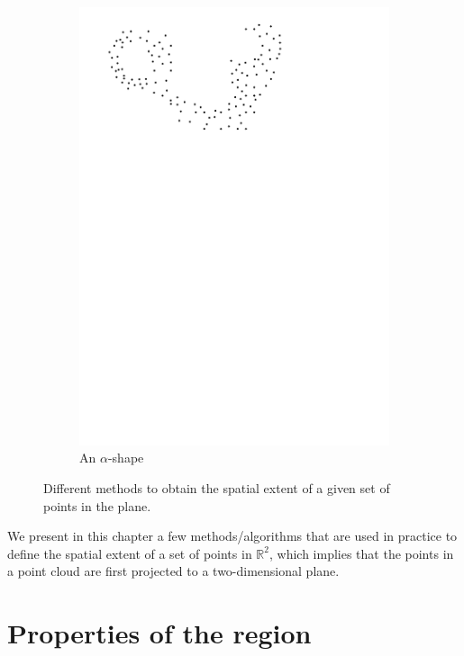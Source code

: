 \begin{figure}
\begin{subfigure}[b]{0.21\linewidth}
    \includegraphics[page=4,width=\textwidth]{figs/idea.pdf}
    \caption{An $\alpha$-shape}
  \end{subfigure}
\caption{Different methods to obtain the spatial extent of a given set of points in the plane.}
\label{fig:ideas}  
\end{figure}

%

We present in this chapter a few methods/algorithms that are used in practice to define the spatial extent of a set of points in $\mathbb{R}^2$, which implies that the points in a point cloud are first projected to a two-dimensional plane.



%
\section{Properties of the region}
\label{sec:properties}

